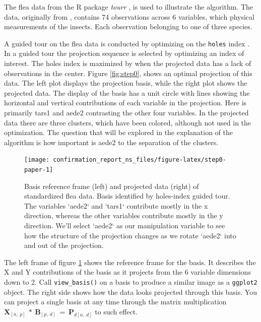 \documentclass{monashthesis}
\begin{document}
The flea data from the R package \emph{tourr}
\autocite{wickham_tourr_2011}, is used to illustrate the algorithm. The
data, originally from \textcite{lubischew_use_1962}, contains 74
observations across 6 variables, which physical measurements of the
insects. Each observation belonging to one of three species.

A guided tour on the flea data is conducted by optimizing on the
\texttt{holes} index \autocite{cook_interactive_2007}. In a guided tour
the projection sequence is selected by optimizing an index of interest.
The holes index is maximized by when the projected data has a lack of
observations in the center. Figure \ref{fig:step0}, shows an optimal
projection of this data. The left plot displays the projection basis,
while the right plot shows the projected data. The display of the basis
has a unit circle with lines showing the horizontal and vertical
contributions of each variable in the projection. Here is primarily
tars1 and aede2 contrasting the other four variables. In the projected
data there are three clusters, which have been colored, although not
used in the optimization. The question that will be explored in the
explanation of the algorithm is how important is aede2 to the separation
of the clusters.

\begin{figure}

{\centering \texttt{[image: confirmation\_report\_ns\_files/figure-latex/step0-paper-1]} 

}

\caption{Basis reference frame (left) and projected data (right) of standardized flea data. Basis identified by holes-index guided tour. The variables `aede2` and `tars1` contribute mostly in the x direction, whereas the other variables contribute mostly in the y direction. We'll select `aede2` as our manipulation variable to see how the structure of the projection changes as we rotate `aede2` into and out of the projection.}\label{fig:step0-paper}
\end{figure}

The left frame of figure \ref{fig:step0-paper} shows the reference frame
for the basis. It describes the X and Y contributions of the basis as it
projects from the 6 variable dimensions down to 2. Call
\texttt{view\_basis()} on a basis to produce a similar image as a
\texttt{ggplot2} object. The right side shows how the data looks
projected through this basis. You can project a single basis at any time
through the matrix multiplication
\(\textbf{X}_{[n,~p]} ~*~ \textbf{B}_{[p,~d]} ~=~ \textbf{P}_{d[n,~d]}\)
to such effect.
\end{document}

